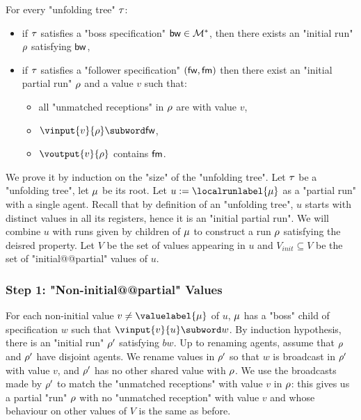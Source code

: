 \begin{lemma}
\label{lem:tree-to-run-technical}
For every "unfolding tree" $\tau$:
\begin{itemize}
	\item if $\tau$ satisfies a "boss specification" $\mathsf{bw} \in \mathcal{M}^*$, then there exists an "initial run" $\rho$ satisfying $\mathsf{bw}$,
	\item if $\tau$ satisfies a "follower specification" $(\mathsf{fw}, \mathsf{fm})$ then there exist an "initial partial run" $\rho$ and a value $v$ such that:
	\begin{itemize}
	\item all "unmatched receptions" in $\rho$ are with value $v$,
	\item $\vinput{v}{\run} \subword \followwordspec$, 
	\item $\voutput{v}{\run}$ contains $\mathsf{fm}$.
	\end{itemize}
\end{itemize}
\end{lemma}

We prove it by induction on the "size" of the "unfolding tree".
Let $\tau$ be a "unfolding tree", let $\mu$ be its root.
Let $u := \localrunlabel{\node}$ as a "partial run" with a single agent. Recall that by definition of an "unfolding tree", $u$ starts with distinct values in all its registers, hence it is an "initial partial run".
We will combine $u$ with runs given by children of $\mu$ to construct a run $\rho$ satisfying the deisred property.
Let $V$ be the set of values appearing in $u$ and $V_{init} \subseteq V$ be the set of "initial@@partial" values of $u$.

\subsubsection{Step 1: "Non-initial@@partial" Values}
\label{sec:tree-to-run-step-one}

For each non-initial value $v \ne \valuelabel{\node}$ of $u$, $\mu$ has a "boss" child of specification $w$ such that $\vinput{v}{u} \subword w$.
By induction hypothesis, there is an "initial run" $\rho'$ satisfying $bw$. Up to renaming agents, assume that $\rho$ and $\rho'$ have disjoint agents.
We rename values in $\rho'$ so that $w$ is broadcast in $\rho'$ with value $v$, and $\rho'$ has no other shared value with $\rho$. 
We use the broadcasts made by $\rho'$ to match the "unmatched receptions" with value $v$ in $\rho$: this gives us a partial "run" $\rho$ with no "unmatched reception" with value $v$ and whose behaviour on other values of $V$ is the same as before.

